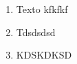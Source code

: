 \documentclass[a4paper, 12pt]{article}
\begin{document}
\begin{enumerate}
	\item Texto kfkfkf
	\item Tdsdsdsd
	\item   KDSKDKSD
\end{enumerate}
\end{document}
